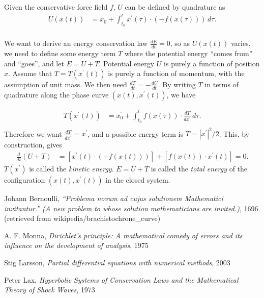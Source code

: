 \documentclass[11pt,a4paper]{memoir}
\newcommand{\pr}{\prime}
\begin{document}
Given the conservative force field $f$, $U$ can be defined by quadrature as
\begin{equation}
\begin{split}
    U(x(t)) &= x_0 + \int_{t_0}^t x^\pr(\tau) \cdot(-f(x(\tau)))\, d\tau. \\
\end{split}
\end{equation}

We want to derive an energy conservation law $\frac{dE}{dt} = 0$, so as $U(x(t))$ varies, we need to define
some energy term $T$ where the potential energy ``comes from'' and ``goes'', and let $E = U + T$.
Potential energy $U$ is purely a function of position $x$. Assume that $T = T(x^\pr(t))$ is purely a function of momentum, with the assumption of unit mass.
We then need $\frac{dT}{dt} = -\frac{dU}{dt}$. By writing $T$ in terms of quadrature along the phase curve $(x(t),x^\pr(t))$, we have

\begin{equation}
\begin{split}
    T(x^\pr(t)) &= x_0^\pr + \int_{t_0}^t f(x(\tau)) \cdot \frac{dT}{dx^\pr}\, d\tau. \\
\end{split}
\end{equation}
Therefore we want $\frac{dT}{dx^\pr} = x^\pr$, and a possible energy term is $T = |x^\pr|^2/2$.
This, by construction, gives
\begin{equation}
\begin{split}
    \frac{d}{dt}\left(U + T\right) &= \left[x^\pr(t)\cdot (-f(x(t)))\right] + \left[f(x(t))\cdot x^\pr(t)\right] = 0.
\end{split}
\end{equation}
$T(x^\pr)$ is called the \textit{kinetic energy}. $E = U + T$ is called the \textit{total energy} of the configuration $(x(t), x^\pr(t))$ in the closed system.





\begin{thebibliography}{9}
Johann Bernoulli, \textit{``Problema novum ad cujus solutionem Mathematici invitantur.'' (A new problem to whose solution mathematicians are invited.)}, 1696.
(retrieved from wikipedia/brachistochrone\_curve)

A. F. Monna, \textit{Dirichlet's principle: A mathematical comedy of errors and its influence on the development of analysis}, 1975


Stig Larsson, \textit{Partial differential equations with numerical methods}, 2003

Peter Lax, \textit{Hyperbolic Systems of Conservation Laws and the Mathematical Theory of Shock Waves}, 1973


\end{thebibliography}
\end{document}
